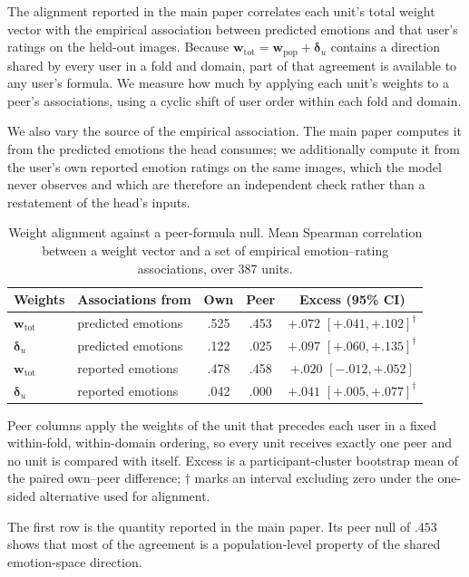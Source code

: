 The alignment reported in the main paper correlates each unit's total weight
vector with the empirical association between predicted emotions and that
user's ratings on the held-out images. Because
$\mathbf w_{\mathrm{tot}}=\mathbf w_{\mathrm{pop}}+\boldsymbol\delta_u$
contains a direction shared by every user in a fold and domain, part of that
agreement is available to any user's formula. We measure how much by applying
each unit's weights to a peer's associations, using a cyclic shift of user
order within each fold and domain.

We also vary the source of the empirical association. The main paper computes
it from the predicted emotions the head consumes; we additionally compute it
from the user's own reported emotion ratings on the same images, which the
model never observes and which are therefore an independent check rather than a
restatement of the head's inputs.

\begin{table}[t]
\centering
\begin{threeparttable}
\caption{Weight alignment against a peer-formula null. Mean Spearman
correlation between a weight vector and a set of empirical emotion--rating
associations, over $387$ units.}
\label{tab:alignment_null}
\small
\setlength{\tabcolsep}{4pt}
\begin{tabular}{llccc}
\toprule
Weights & Associations from & Own & Peer & Excess (95\% CI) \\
\midrule
$\mathbf w_{\mathrm{tot}}$ & predicted emotions & .525 & .453 & $+.072$ $[+.041,+.102]^{\dagger}$ \\
$\boldsymbol\delta_u$      & predicted emotions & .122 & .025 & $+.097$ $[+.060,+.135]^{\dagger}$ \\
$\mathbf w_{\mathrm{tot}}$ & reported emotions  & .478 & .458 & $+.020$ $[-.012,+.052]$ \\
$\boldsymbol\delta_u$      & reported emotions  & .042 & .000 & $+.041$ $[+.005,+.077]^{\dagger}$ \\
\bottomrule
\end{tabular}
\begin{tablenotes}[flushleft]\footnotesize
\item Peer columns apply the weights of the unit that precedes each user in a
fixed within-fold, within-domain ordering, so every unit receives exactly one
peer and no unit is compared with itself. Excess is a participant-cluster
bootstrap mean of the paired own--peer difference; $\dagger$ marks an interval
excluding zero under the one-sided alternative used for alignment.
\item The first row is the quantity reported in the main paper. Its peer null
of $.453$ shows that most of the agreement is a population-level property of
the shared emotion-space direction.
\end{tablenotes}
\end{threeparttable}
\end{table}

